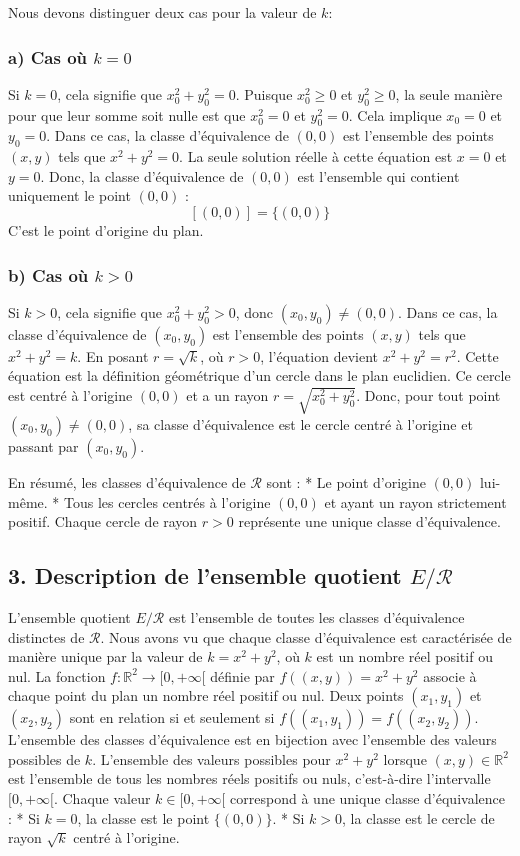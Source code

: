 \documentclass{report}
\begin{document}
Nous devons distinguer deux cas pour la valeur de $k$:

\subsubsection*{a) Cas où $k = 0$}
Si $k = 0$, cela signifie que $x_0^2 + y_0^2 = 0$. Puisque $x_0^2 \ge 0$ et $y_0^2 \ge 0$, la seule manière pour que leur somme soit nulle est que $x_0^2 = 0$ et $y_0^2 = 0$. Cela implique $x_0 = 0$ et $y_0 = 0$.
Dans ce cas, la classe d'équivalence de $(0, 0)$ est l'ensemble des points $(x, y)$ tels que $x^2 + y^2 = 0$.
La seule solution réelle à cette équation est $x=0$ et $y=0$.
Donc, la classe d'équivalence de $(0, 0)$ est l'ensemble qui contient uniquement le point $(0, 0)$ :
$$ [(0, 0)] = \{ (0, 0) \} $$
C'est le point d'origine du plan.

\subsubsection*{b) Cas où $k > 0$}
Si $k > 0$, cela signifie que $x_0^2 + y_0^2 > 0$, donc $(x_0, y_0) \neq (0, 0)$.
Dans ce cas, la classe d'équivalence de $(x_0, y_0)$ est l'ensemble des points $(x, y)$ tels que $x^2 + y^2 = k$.
En posant $r = \sqrt{k}$, où $r > 0$, l'équation devient $x^2 + y^2 = r^2$.
Cette équation est la définition géométrique d'un cercle dans le plan euclidien. Ce cercle est centré à l'origine $(0, 0)$ et a un rayon $r = \sqrt{x_0^2 + y_0^2}$.
Donc, pour tout point $(x_0, y_0) \neq (0, 0)$, sa classe d'équivalence est le cercle centré à l'origine et passant par $(x_0, y_0)$.

En résumé, les classes d'équivalence de $\mathcal{R}$ sont :
*   Le point d'origine $(0, 0)$ lui-même.
*   Tous les cercles centrés à l'origine $(0, 0)$ et ayant un rayon strictement positif. Chaque cercle de rayon $r > 0$ représente une unique classe d'équivalence.

\subsection*{3. Description de l'ensemble quotient $E/\mathcal{R}$}

L'ensemble quotient $E/\mathcal{R}$ est l'ensemble de toutes les classes d'équivalence distinctes de $\mathcal{R}$.
Nous avons vu que chaque classe d'équivalence est caractérisée de manière unique par la valeur de $k = x^2 + y^2$, où $k$ est un nombre réel positif ou nul.
La fonction $f: \mathbb{R}^2 \to [0, +\infty[$ définie par $f((x, y)) = x^2 + y^2$ associe à chaque point du plan un nombre réel positif ou nul.
Deux points $(x_1, y_1)$ et $(x_2, y_2)$ sont en relation si et seulement si $f((x_1, y_1)) = f((x_2, y_2))$.
L'ensemble des classes d'équivalence est en bijection avec l'ensemble des valeurs possibles de $k$.
L'ensemble des valeurs possibles pour $x^2 + y^2$ lorsque $(x, y) \in \mathbb{R}^2$ est l'ensemble de tous les nombres réels positifs ou nuls, c'est-à-dire l'intervalle $[0, +\infty[$.
Chaque valeur $k \in [0, +\infty[$ correspond à une unique classe d'équivalence :
*   Si $k=0$, la classe est le point $\{(0,0)\}$.
*   Si $k>0$, la classe est le cercle de rayon $\sqrt{k}$ centré à l'origine.
\end{document}
